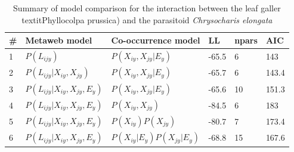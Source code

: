 \documentclass[12pt]{article}
\begin{document}
\newpage

\begin{landscape}
\begin{table}[]
\centering 
\caption{Summary of model comparison for the interaction between the leaf
galler textit{Phyllocolpa prussica}) and the parasitoid \textit{Chrysocharis
elongata}}
\begin{tabular}{llllll}
\hline
	\# & Metaweb model 						& Co-occurrence model 			& LL 	& npars & AIC \\ \hline
	1  & $P(L_{ijy})$ 						& $P(X_{iy},X_{jy}|E_y)$ 		& -65.5 & 6 	& 143 \\ 
	2  & $P(L_{ijy} | X_{iy}, X_{jy})$ 		& $P(X_{iy},X_{jy}|E_y)$ 		& -65.7 & 6 	& 143.4 \\ 
	3  & $P(L_{ijy} | X_{iy}, X_{jy}, E_y)$ & $P(X_{iy},X_{jy}|E_y)$ 		& -65.6 & 10 	& 151.3 \\ \hline
	4  & $P(L_{ijy} | X_{iy}, X_{jy}, E_y)$ & $P(X_{iy},X_{jy})$ 			& -84.5 & 6 	& 183 \\ 
	5  & $P(L_{ijy} | X_{iy}, X_{jy}, E_y)$ & $P(X_{iy})P(X_{jy})$ 			& -80.7 & 7 	& 173.4 \\ 
	6  & $P(L_{ijy} | X_{iy}, X_{jy}, E_y)$ & $P(X_{iy}|E_y)P(X_{jy}|E_y)$ 	& -68.8 & 15 	& 167.6 \\ 
\hline
\end{tabular}
\end{table}
\end{landscape}

\newpage
\end{document}
